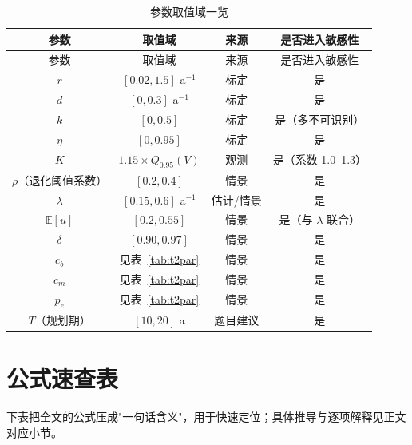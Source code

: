 \documentclass[11pt,a4paper]{ctexart}
\newcommand{\E}{\mathbb{E}}
\begin{document}
\begin{longtable}{|c|c|c|c|}
\caption{参数取值域一览}\label{tab:parrange}\\
\hline
参数 & 取值域 & 来源 & 是否进入敏感性 \\
\hline
\endfirsthead
\hline
参数 & 取值域 & 来源 & 是否进入敏感性 \\
\hline
\endhead
$r$ & $[0.02,1.5]$ a$^{-1}$ & 标定 & 是 \\
$d$ & $[0,0.3]$ a$^{-1}$ & 标定 & 是 \\
$k$ & $[0,0.5]$ & 标定 & 是（多不可识别） \\
$\eta$ & $[0,0.95]$ & 标定 & 是 \\
$K$ & $1.15\times Q_{0.95}(V)$ & 观测 & 是（系数 1.0--1.3） \\
$\rho$（退化阈值系数） & $[0.2,0.4]$ & 情景 & 是 \\
$\lambda$ & $[0.15,0.6]$ a$^{-1}$ & 估计/情景 & 是 \\
$\E[u]$ & $[0.2,0.55]$ & 情景 & 是（与 $\lambda$ 联合） \\
$\delta$ & $[0.90,0.97]$ & 情景 & 是 \\
$c_b$ & 见表~\ref{tab:t2par} & 情景 & 是 \\
$c_m$ & 见表~\ref{tab:t2par} & 情景 & 是 \\
$p_e$ & 见表~\ref{tab:t2par} & 情景 & 是 \\
$T$（规划期） & $[10,20]$ a & 题目建议 & 是 \\
\hline
\end{longtable}


\section{公式速查表}\label{app:cheat}

下表把全文的公式压成"一句话含义"，用于快速定位；具体推导与逐项解释见正文对应小节。
\end{document}
